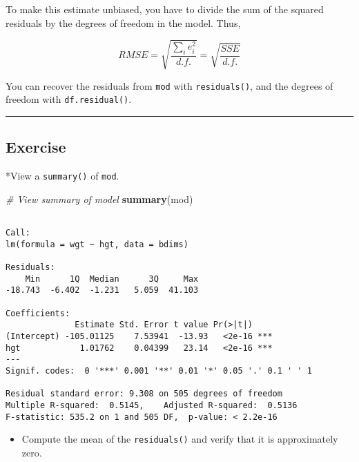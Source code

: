 \documentclass[
]{book}
\newenvironment{Shaded}{\begin{snugshade}}{\end{snugshade}}
\newcommand{\CommentTok}[1]{\textcolor[rgb]{0.56,0.35,0.01}{\textit{#1}}}
\newcommand{\KeywordTok}[1]{\textcolor[rgb]{0.13,0.29,0.53}{\textbf{#1}}}
\newcommand{\NormalTok}[1]{#1}
\providecommand{\tightlist}{%
  \setlength{\itemsep}{0pt}\setlength{\parskip}{0pt}}
\begin{document}
To make this estimate unbiased, you have to divide the sum of the squared residuals by the degrees of freedom in the model. Thus,

\begin{equation}
RMSE = \sqrt{\frac{\sum_i e_i^2}{d.f.}} = \sqrt{\frac{SSE}{d.f.}}
\end{equation}

You can recover the residuals from \texttt{mod} with \texttt{residuals()}, and the degrees of freedom with \texttt{df.residual()}.

\begin{center}\rule{0.5\linewidth}{0.5pt}\end{center}

\hypertarget{exercise-11}{%
\subsection*{Exercise}\label{exercise-11}}

*View a \texttt{summary()} of \texttt{mod}.

\begin{Shaded}
\begin{Highlighting}[]
\CommentTok{# View summary of model}
\KeywordTok{summary}\NormalTok{(mod)}
\end{Highlighting}
\end{Shaded}

\begin{verbatim}

Call:
lm(formula = wgt ~ hgt, data = bdims)

Residuals:
    Min      1Q  Median      3Q     Max 
-18.743  -6.402  -1.231   5.059  41.103 

Coefficients:
              Estimate Std. Error t value Pr(>|t|)    
(Intercept) -105.01125    7.53941  -13.93   <2e-16 ***
hgt            1.01762    0.04399   23.14   <2e-16 ***
---
Signif. codes:  0 '***' 0.001 '**' 0.01 '*' 0.05 '.' 0.1 ' ' 1

Residual standard error: 9.308 on 505 degrees of freedom
Multiple R-squared:  0.5145,    Adjusted R-squared:  0.5136 
F-statistic: 535.2 on 1 and 505 DF,  p-value: < 2.2e-16
\end{verbatim}

\begin{itemize}
\tightlist
\item
  Compute the mean of the \texttt{residuals()} and verify that it is approximately zero.
\end{itemize}
\end{document}
